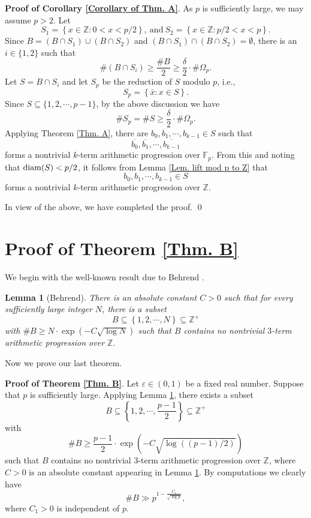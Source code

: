 \documentclass[12pt]{amsart}
\def\diam{{\rm diam}}
\theoremstyle{plain}
\newtheorem{lemma}{Lemma}
\theoremstyle{remark}
\begin{document}
	{\noindent\bfseries Proof of Corollary \ref{Corollary of Thm. A}}. As $p$ is sufficiently large, we may assume $p>2$. Let 
	$$S_1=\left\{x\in\mathbb{Z}: 0<x<p/2\right\},\ \text{and}\ S_2=\left\{x\in\mathbb{Z}: p/2<x<p\right\}.$$
	Since $B=(B\cap S_1)\cup (B\cap S_2)$ and $(B\cap S_1)\cap (B\cap S_2)=\emptyset$, there is an $i\in\{1,2\}$ such that 
	$$\#(B\cap S_i)\ge \frac{\#B}{2}\ge\frac{\delta}{2}\cdot \#\Omega_p.$$
	Let $S=B\cap S_i$ and let $S_p$ be the reduction of $S$ modulo $p$, i.e., 
	$$S_p=\left\{\bar{x}: x\in S\right\}.$$
	Since $S\subseteq\{1,2,\cdots,p-1\}$, by the above discussion we have 
	$$\#S_p=\# S\ge\frac{\delta}{2}\cdot \#\Omega_p.$$
	Applying Theorem \ref{Thm. A}, there are $b_0,b_1,\cdots,b_{k-1}\in S$ such that 
	$$\overline{b_0},\overline{b_1},\cdots,\overline{b_{k-1}}$$
	forms a nontrivial $k$-term arithmetic progression over $\mathbb{F}_p$. From this and noting that $\diam(S)<p/2$, it follows from Lemma \ref{Lem. lift mod p to Z} that 
	$$b_0,b_1,\cdots,b_{k-1}\in S$$
	forms a nontrivial $k$-term arithmetic progression over $\mathbb{Z}$. 
	
	In view of the above, we have completed the proof. \qed 
	
	
	
	\section{Proof of Theorem \ref{Thm. B}}
	\setcounter{lemma}{0}
	\setcounter{theorem}{0}
	\setcounter{equation}{0}
	\setcounter{conjecture}{0}
	\setcounter{remark}{0}
	\setcounter{corollary}{0}
	
	
	We begin with the well-known result due to Behrend \cite{Behrend}.
	
	\begin{lemma}[Behrend]\label{Lem. the Behrend theorem}
		There is an absolute constant $C>0$ such that for every sufficiently large integer $N$, there is a subset 
		$$B\subseteq\left\{1,2,\cdots,N\right\}\subseteq\mathbb{Z}^+$$
		with $\#B\ge N\cdot\exp\left(-C\sqrt{\log N}\right)$ such that $B$ contains no nontrivial $3$-term arithmetic progression over $\mathbb{Z}$. 
	\end{lemma}
	
	Now we prove our last theorem.
	
	{\noindent\bfseries Proof of Theorem \ref{Thm. B}}. Let $\varepsilon\in(0,1)$ be a fixed real number. Suppose that $p$ is sufficiently large. Applying Lemma \ref{Lem. the Behrend theorem}, there exists a subset 
	$$B\subseteq\left\{1,2,\cdots,\frac{p-1}{2}\right\}\subseteq\mathbb{Z}^+$$
	with 
	$$\#B\ge \frac{p-1}{2}\cdot\exp\left(-C\sqrt{\log ((p-1)/2)}\right)$$
	such that $B$ contains no nontrivial $3$-term arithmetic progression over $\mathbb{Z}$, where $C>0$ is an absolute constant appearing in Lemma \ref{Lem. the Behrend theorem}. By computations we clearly have 
	\begin{equation}\label{Eq. lower bound for B in the proof of Thm. B}
		\#B\gg p^{1-\frac{C_1}{\sqrt{\log p}}},
	\end{equation}
	where $C_1>0$ is independent of $p$. 
	
\end{document}
